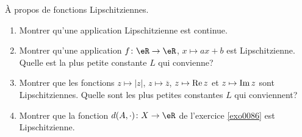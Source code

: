 
\begin{exercice}\label{exo0087}

  À propos de fonctions Lipschitziennes.
\begin{enumerate}
\item
Montrer qu'une application Lipschitzienne est continue.

\item
Montrer qu'une application $f \colon \eR \to \eR$, $x \mapsto ax+b$ est Lipschitzienne.  Quelle est la plus petite constante $L$ qui convienne?

\item
 Montrer que les fonctions $z \mapsto |z|$, $z \mapsto \overline z$, $z \mapsto {\rm Re\,} z$ et $z \mapsto {\rm Im\,} z$ sont Lipschitziennes.  Quelle sont les plus petites constantes $L$ qui conviennent?

\item 
Montrer que la fonction $d(A,\cdot)\colon X \to \eR$ de l'exercice \ref{exo0086} est Lipschitzienne.

\end{enumerate}

\end{exercice}
